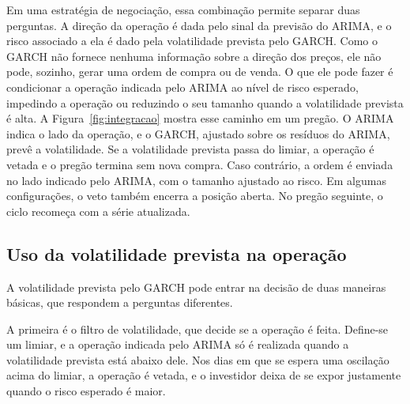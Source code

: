 Em uma estratégia de negociação, essa combinação permite separar duas perguntas. A
direção da operação é dada pelo sinal da previsão do ARIMA, e o risco associado a
ela é dado pela volatilidade prevista pelo GARCH. Como o GARCH não fornece nenhuma
informação sobre a direção dos preços, ele não pode, sozinho, gerar uma ordem de
compra ou de venda. O que ele pode fazer é condicionar a operação indicada pelo
ARIMA ao nível de risco esperado, impedindo a operação ou reduzindo o seu tamanho
quando a volatilidade prevista é alta. A Figura~\ref{fig:integracao} mostra esse
caminho em um pregão. O ARIMA indica o lado da operação, e o GARCH, ajustado sobre
os resíduos do ARIMA, prevê a volatilidade. Se a volatilidade prevista passa do
limiar, a operação é vetada e o pregão termina sem nova compra. Caso contrário, a ordem
é enviada no lado indicado pelo ARIMA, com o tamanho ajustado ao risco. Em algumas
configurações, o veto também encerra a posição aberta. No pregão seguinte, o ciclo
recomeça com a série atualizada.


\subsection{Uso da volatilidade prevista na operação}

A volatilidade prevista pelo GARCH pode entrar na decisão de duas maneiras
básicas, que respondem a perguntas diferentes.

A primeira é o filtro de volatilidade, que decide se a operação é feita.
Define-se um limiar, e a operação indicada pelo ARIMA só é realizada quando a
volatilidade prevista está abaixo dele. Nos dias em que se espera uma oscilação
acima do limiar, a operação é vetada, e o investidor deixa de se expor justamente
quando o risco esperado é maior.

